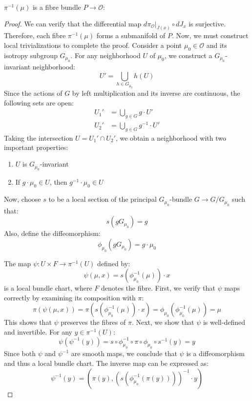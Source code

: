 \begin{theorem}
$\pi^{-1}(\mu)$ is a fibre bundle $P \to \mathcal{O}$:
\end{theorem}

\begin{proof}
We can verify that the differential map $d\pi_{\mathcal{O}}|_{J(x)} \circ dJ_x$ is surjective. Therefore, each fibre $\pi^{-1}(\mu)$ forms a submanifold of $P$. Now, we must construct local trivializations to complete the proof. Consider a point $\mu_0 \in \mathcal{O}$ and its isotropy subgroup $G_{\mu_0}$. For any neighborhood $U$ of $\mu_0$, we construct a $G_{\mu_0}$-invariant neighborhood:
\begin{equation}
U' = \bigcup_{h \in G_{\mu_0}} h(U)
\end{equation}
Since the actions of $G$ by left multiplication and its inverse are continuous, the following sets are open:
\begin{align}
U_1' &= \bigcup_{g \in G} g \cdot U'\\
U_2' &= \bigcup_{g \in G} g^{-1} \cdot U'
\end{align}
Taking the intersection $U = U_1' \cap U_2'$, we obtain a neighborhood with two important properties:
\begin{enumerate}
\item $U$ is $G_{\mu_0}$-invariant
\item If $g \cdot \mu_0 \in U$, then $g^{-1} \cdot \mu_0 \in U$
\end{enumerate}
Now, choose $s$ to be a local section of the principal $G_{\mu_0}$-bundle $G \to G/G_{\mu_0}$ such that:
\begin{equation}
s(g G_{\mu_0}) = g
\end{equation}
Also, define the diffeomorphism:
\begin{equation}
\phi_{\mu_0}(g G_{\mu_0}) = g \cdot \mu_0
\end{equation}

\noindent The map $\psi: U \times F \to \pi^{-1}(U)$ defined by:
\begin{equation}
\psi(\mu, x) = s(\phi^{-1}_{\mu_0}(\mu)) \cdot x
\end{equation}
is a local bundle chart, where $F$ denotes the fibre. First, we verify that $\psi$ maps correctly by examining its composition with $\pi$:
\begin{equation}
\pi(\psi(\mu, x)) = \pi(s(\phi_{\mu_0}^{-1}(\mu)) \cdot x) = \phi_{\mu_0}(\phi_{\mu_0}^{-1}(\mu)) = \mu
\end{equation}
This shows that $\psi$ preserves the fibres of $\pi$. Next, we show that $\psi$ is well-defined and invertible. For any $y \in \pi^{-1}(U)$:
\begin{equation}
\psi(\psi^{-1}(y)) = s \circ \phi^{-1}_{\mu_0} \circ \pi \circ \phi_{\mu_0} \circ s^{-1}(y) = y
\end{equation}
Since both $\psi$ and $\psi^{-1}$ are smooth maps, we conclude that $\psi$ is a diffeomorphism and thus a local bundle chart. The inverse map can be expressed as:
\begin{equation}
\psi^{-1}(y) = (\pi(y), (s(\phi_{\mu_0}^{-1}(\pi(y))))^{-1} \cdot y)
\end{equation}


\end{proof}
